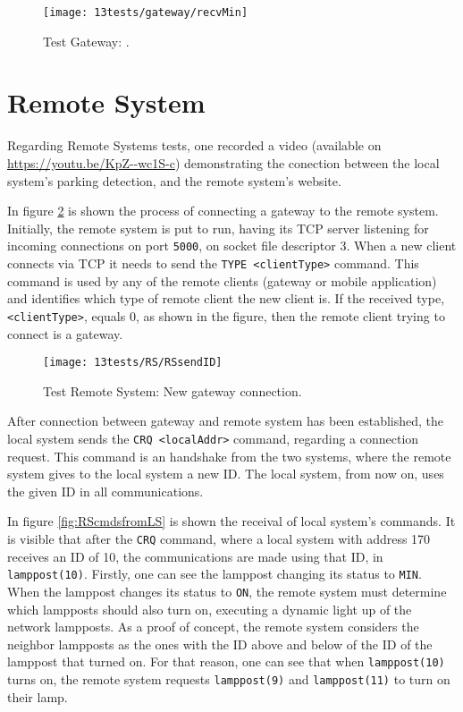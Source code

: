 \begin{figure}[H]
	\centering	
	\texttt{[image: 13tests/gateway/recvMin]}
	\caption{Test Gateway: .}
	\label{fig:}
\end{figure}

\clearpage
\section{Remote System}

Regarding Remote Systems tests, one recorded a video (available on \linebreak \url{https://youtu.be/KpZ--wc1S-c}) demonstrating the conection between the local system's parking detection, and the remote system's website.

In figure \ref{fig:rsnewgateway} is shown the process of connecting a gateway to the remote system. Initially, the remote system is put to run, having its TCP server listening for incoming connections on port \verb|5000|, on socket file descriptor 3. When a new client connects via TCP it needs to send the \verb|TYPE <clientType>| command. This command is used by any of the remote clients (gateway or mobile application) and identifies which type of remote client the new client is. If the received type, \verb|<clientType>|, equals 0, as shown in the figure, then the remote client trying to connect is a gateway.

\begin{figure}[H]
	\centering	
	\texttt{[image: 13tests/RS/RSsendID]}
	\caption{Test Remote System: New gateway connection.}
	\label{fig:rsnewgateway}
\end{figure}

After connection between gateway and remote system has been established, the local system sends the \verb|CRQ <localAddr>| command, regarding a connection request. This command is an handshake from the two systems, where the remote system gives to the local system a new ID. The local system, from now on, uses the given ID in all communications.

In figure \ref{fig:RScmdsfromLS} is shown the receival of local system's commands. It is visible that after the \verb|CRQ| command, where a local system with address 170 receives an ID of 10, the communications are made using that ID, in \verb|lamppost(10)|. Firstly, one can see the lamppost changing its status to \verb|MIN|. When the lamppost changes its status to \verb|ON|, the remote system must determine which lampposts should also turn on, executing a dynamic light up of the network lampposts. As a proof of concept, the remote system considers the neighbor lampposts as the ones with the ID above and below of the ID of the lamppost that turned on. For that reason, one can see that when \verb|lamppost(10)| turns on, the remote system requests \verb|lamppost(9)| and \verb|lamppost(11)| to turn on their lamp.

